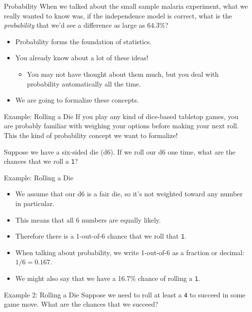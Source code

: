 \begin{frame}{Probability}
    When we talked about the small sample malaria experiment, what we really wanted to know was, if the independence model is correct, what is the \textit{probability} that we'd see a difference as large as 64.3\%?
    \begin{itemize}
        \item Probability forms the foundation of statistics.
        \item You already know about a lot of these ideas!
        \begin{itemize}
            \item You may not have thought about them much, but you deal with probability automatically all the time. 
        \end{itemize}
        \item We are going to formalize these concepts.
    \end{itemize}
\end{frame}

\begin{frame}{Example: Rolling a Die}
    If you play any kind of dice-based tabletop games, you are probably familiar with weighing your options before making your next roll. This the kind of probability concept we want to formalize!
    
    \vspace{12pt}Suppose we have a six-sided die (d6). If we roll our d6 one time, what are the chances that we roll a \texttt{1}?
\end{frame}

\begin{frame}{Example: Rolling a Die}
    \begin{itemize}
        \item We assume that our d6 is a fair die, so it's not weighted toward any number in particular. 
        \item This means that all 6 numbers are equally likely.
        \item Therefore there is a 1-out-of-6 chance that we roll that \texttt{1}.
        \item When talking about probability, we write 1-out-of-6 as a fraction or decimal: $1/6 = 0.167$.
        \item We might also say that we have a 16.7\% chance of rolling a \texttt{1}.
    \end{itemize}
\end{frame}

\begin{frame}{Example 2: Rolling a Die}
    Suppose we need to roll at least a \texttt{4} to succeed in some game move. What are the chances that we succeed?
\end{frame}

